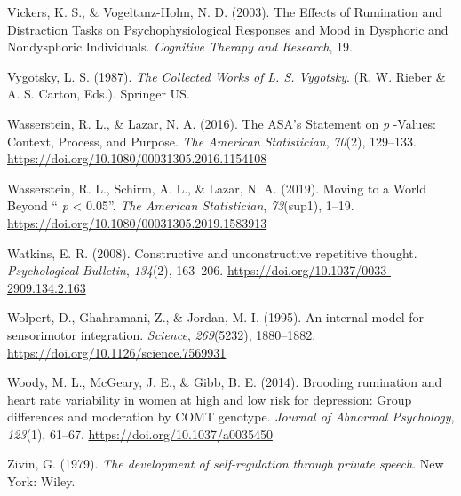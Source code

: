 \documentclass[a4paper,12pt,twoside,openright,oldfontcommands]{memoir}
\begin{document}
\hypertarget{ref-vickers_effects_2003}{}
Vickers, K. S., \& Vogeltanz-Holm, N. D. (2003). The Effects of
Rumination and Distraction Tasks on Psychophysiological Responses and
Mood in Dysphoric and Nondysphoric Individuals. \emph{Cognitive Therapy
and Research}, 19.

\hypertarget{ref-vygotsky_collected_1987}{}
Vygotsky, L. S. (1987). \emph{The Collected Works of L. S. Vygotsky}.
(R. W. Rieber \& A. S. Carton, Eds.). Springer US.

\hypertarget{ref-wasserstein_asas_2016}{}
Wasserstein, R. L., \& Lazar, N. A. (2016). The ASA's Statement on
\emph{p} -Values: Context, Process, and Purpose. \emph{The American
Statistician}, \emph{70}(2), 129--133.
\url{https://doi.org/10.1080/00031305.2016.1154108}

\hypertarget{ref-wasserstein_moving_2019}{}
Wasserstein, R. L., Schirm, A. L., \& Lazar, N. A. (2019). Moving to a
World Beyond `` \emph{p} \textless{} 0.05''. \emph{The American
Statistician}, \emph{73}(sup1), 1--19.
\url{https://doi.org/10.1080/00031305.2019.1583913}

\hypertarget{ref-Watkins2008}{}
Watkins, E. R. (2008). Constructive and unconstructive repetitive
thought. \emph{Psychological Bulletin}, \emph{134}(2), 163--206.
\url{https://doi.org/10.1037/0033-2909.134.2.163}

\hypertarget{ref-wolpert_internal_1995}{}
Wolpert, D., Ghahramani, Z., \& Jordan, M. I. (1995). An internal model
for sensorimotor integration. \emph{Science}, \emph{269}(5232),
1880--1882. \url{https://doi.org/10.1126/science.7569931}

\hypertarget{ref-woody_brooding_2014}{}
Woody, M. L., McGeary, J. E., \& Gibb, B. E. (2014). Brooding rumination
and heart rate variability in women at high and low risk for depression:
Group differences and moderation by COMT genotype. \emph{Journal of
Abnormal Psychology}, \emph{123}(1), 61--67.
\url{https://doi.org/10.1037/a0035450}

\hypertarget{ref-zivin_development_1979}{}
Zivin, G. (1979). \emph{The development of self-regulation through
private speech}. New York: Wiley.
\end{document}

